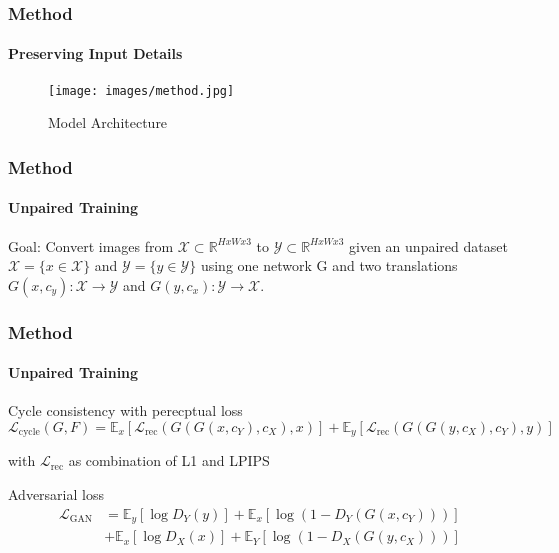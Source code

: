 \documentclass[aspectratio=169, lecture, amberg]{OTHAWbeamer}
\begin{document}
\begin{frame}
\frametitle{Method}
\framesubtitle{Preserving Input Details}
\begin{figure}
    \centering
    \texttt{[image: images/method.jpg]}
    \caption{Model Architecture}
\end{figure}
\end{frame}

\begin{frame}
\frametitle{Method}
\framesubtitle{Unpaired Training}
Goal: Convert images from $\mathcal{X} \subset \mathbb{R} ^{H x W x 3}$ to $\mathcal{Y} \subset \mathbb{R} ^{H x W x 3}$ \newline
given an unpaired dataset $\mathcal{X} = \{x \in \mathcal{X} \}$ and $\mathcal{Y} = \{y \in \mathcal{Y} \}$ \newline
using one network G and two translations $G(x, c_y): \mathcal{X} \rightarrow \mathcal{Y}$ and $G(y, c_x): \mathcal{Y} \rightarrow \mathcal{X}$.

\end{frame}

\begin{frame}
\frametitle{Method}
\framesubtitle{Unpaired Training}
\begin{block}{Cycle consistency with perecptual loss}
    \begin{equation}
        \mathcal{L}_{\text{cycle}}(G, F) = \mathbb{E}_x [ \mathcal{L}_\text{rec} (G(G(x,c_Y), c_X), x) ] + \mathbb{E}_y [ \mathcal{L}_\text{rec} (G(G(y,c_X), c_Y), y) ]
    \end{equation}
\end{block}
with $\mathcal{L}_{\text{rec}}$ as combination of L1 and LPIPS \cite{zhang2018unreasonable}
\begin{block}{Adversarial loss}
    \begin{align}
        \mathcal{L}_{\text{GAN}} &= \mathbb{E}_{y} [\log D_Y(y)] + \mathbb{E}_{x} [\log(1 - D_Y(G(x,c_Y)))] \\
        &+ \mathbb{E}_{x} [\log D_X(x)] + \mathbb{E}_{Y} [\log(1 - D_X(G(y,c_X)))]
    \end{align}
\end{block}
\end{frame}
\end{document}
